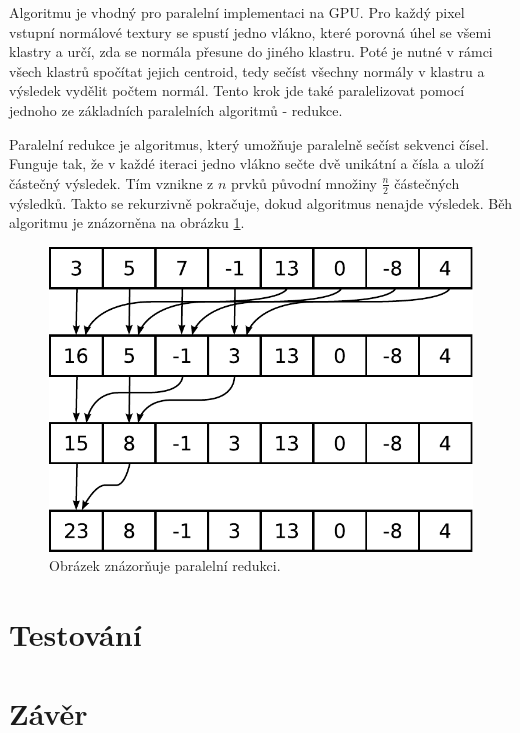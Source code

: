 \documentclass[11pt,twoside,a4paper]{book}
\begin{document}
Algoritmu je vhodný pro paralelní implementaci na GPU. Pro každý pixel vstupní normálové textury se spustí jedno vlákno, které porovná úhel se všemi klastry a určí, zda se normála přesune do jiného klastru. Poté je nutné v rámci všech klastrů spočítat jejich centroid, tedy sečíst všechny normály v klastru a výsledek vydělit počtem normál. Tento krok jde také paralelizovat pomocí jednoho ze základních paralelních algoritmů - redukce.

Paralelní redukce je algoritmus, který umožňuje paralelně sečíst sekvenci čísel. Funguje tak, že v každé iteraci jedno vlákno sečte dvě unikátní a čísla a uloží částečný výsledek. Tím vznikne z $n$ prvků původní množiny $\frac{n}{2}$ částečných výsledků. Takto se rekurzivně pokračuje, dokud algoritmus nenajde výsledek. Běh algoritmu je znázorněna na obrázku \ref{fig:reduction}.

\begin{figure}[bh]
\begin{center}
\includegraphics[width=\textwidth*2/3]{figures/reduction}
\caption{Obrázek znázorňuje paralelní redukci.}
\label{fig:reduction}
\end{center}
\end{figure}




\chapter{Testování}

\chapter{Závěr}
\end{document}
